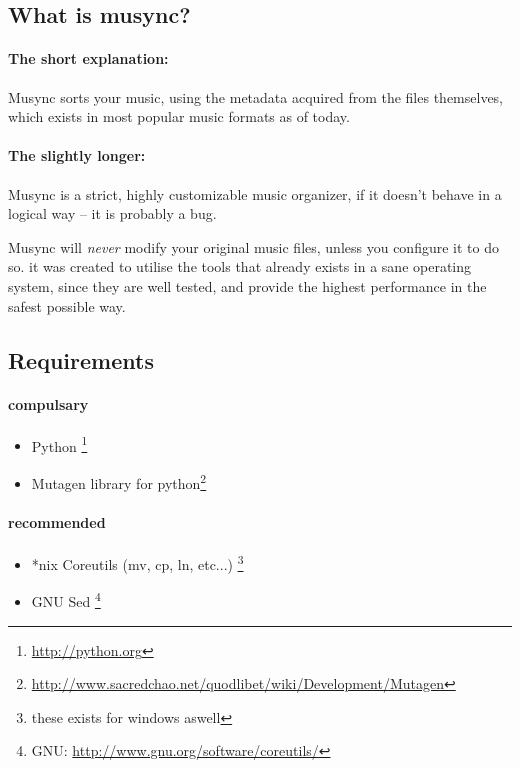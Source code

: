 \subsection{What is musync?}
\paragraph{The short explanation:}
Musync sorts your music, using the metadata acquired from the files themselves, which exists in most popular music formats as of today.

\paragraph{The slightly longer:}
Musync is a strict, highly customizable music organizer, if it doesn't behave in a logical way -- it is probably a bug.

Musync will \emph{never} modify your original music files, unless you configure it to do so.
it was created to utilise the tools that already exists in a sane operating system, since they are well tested, and provide the highest performance in the safest possible way.

\subsection{Requirements}

\paragraph{compulsary}
\begin{itemize}
\item Python \footnote{\url{http://python.org}}
\item Mutagen library for python\footnote{\url{http://www.sacredchao.net/quodlibet/wiki/Development/Mutagen}}
\end{itemize}

\paragraph{recommended}
\begin{itemize}
\item *nix Coreutils (mv, cp, ln, etc...) \footnote{these exists for windows aswell}
\item GNU Sed \footnote{GNU: \url{http://www.gnu.org/software/coreutils/}}
\end{itemize}


